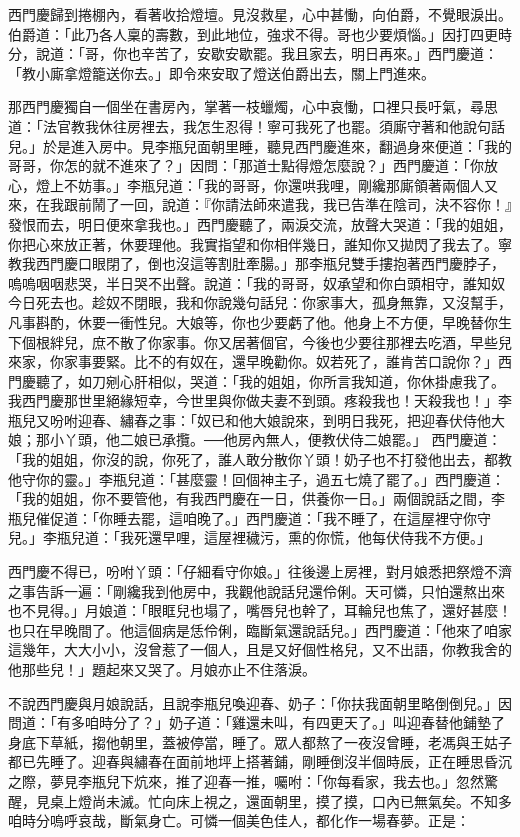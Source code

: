 西門慶歸到捲棚內，看著收拾燈壇。見沒救星，心中甚慟，向伯爵，不覺眼淚出。伯爵道：「此乃各人稟的壽數，到此地位，強求不得。哥也少要煩惱。」因打四更時分，說道：「哥，你也辛苦了，安歇安歇罷。我且家去，明日再來。」西門慶道：「教小廝拿燈籠送你去。」即令來安取了燈送伯爵出去，關上門進來。

那西門慶獨自一個坐在書房內，掌著一枝蠟燭，心中哀慟，口裡只長吁氣，尋思道：「法官教我休往房裡去，我怎生忍得！寧可我死了也罷。須廝守著和他說句話兒。」於是進入房中。見李瓶兒面朝里睡，聽見西門慶進來，翻過身來便道：「我的哥哥，你怎的就不進來了？」因問：「那道士點得燈怎麼說？」西門慶道：「你放心，燈上不妨事。」李瓶兒道：「我的哥哥，你還哄我哩，剛纔那廝領著兩個人又來，在我跟前鬧了一回，說道：『你請法師來遣我，我已告準在陰司，決不容你！』發恨而去，明日便來拿我也。」西門慶聽了，兩淚交流，放聲大哭道：「我的姐姐，你把心來放正著，休要理他。我實指望和你相伴幾日，誰知你又拋閃了我去了。寧教我西門慶口眼閉了，倒也沒這等割肚牽腸。」那李瓶兒雙手摟抱著西門慶脖子，嗚嗚咽咽悲哭，半日哭不出聲。說道：「我的哥哥，奴承望和你白頭相守，誰知奴今日死去也。趁奴不閉眼，我和你說幾句話兒：你家事大，孤身無靠，又沒幫手，凡事斟酌，休要一衝性兒。大娘等，你也少要虧了他。他身上不方便，早晚替你生下個根絆兒，庶不散了你家事。你又居著個官，今後也少要往那裡去吃酒，早些兒來家，你家事要緊。比不的有奴在，還早晚勸你。奴若死了，誰肯苦口說你？」西門慶聽了，如刀剜心肝相似，哭道：「我的姐姐，你所言我知道，你休掛慮我了。我西門慶那世里絕緣短幸，今世里與你做夫妻不到頭。疼殺我也！天殺我也！」李瓶兒又吩咐迎春、繡春之事：「奴已和他大娘說來，到明日我死，把迎春伏侍他大娘；那小丫頭，他二娘已承攬。──他房內無人，便教伏侍二娘罷。」 西門慶道：「我的姐姐，你沒的說，你死了，誰人敢分散你丫頭！奶子也不打發他出去，都教他守你的靈。」李瓶兒道：「甚麼靈！回個神主子，過五七燒了罷了。」西門慶道：「我的姐姐，你不要管他，有我西門慶在一日，供養你一日。」兩個說話之間，李瓶兒催促道：「你睡去罷，這咱晚了。」西門慶道：「我不睡了，在這屋裡守你守兒。」李瓶兒道：「我死還早哩，這屋裡穢污，熏的你慌，他每伏侍我不方便。」

西門慶不得已，吩咐丫頭：「仔細看守你娘。」往後邊上房裡，對月娘悉把祭燈不濟之事告訴一遍：「剛纔我到他房中，我觀他說話兒還伶俐。天可憐，只怕還熬出來也不見得。」月娘道：「眼眶兒也塌了，嘴唇兒也幹了，耳輪兒也焦了，還好甚麼！也只在早晚間了。他這個病是恁伶俐，臨斷氣還說話兒。」西門慶道：「他來了咱家這幾年，大大小小，沒曾惹了一個人，且是又好個性格兒，又不出語，你教我舍的他那些兒！」題起來又哭了。月娘亦止不住落淚。

不說西門慶與月娘說話，且說李瓶兒喚迎春、奶子：「你扶我面朝里略倒倒兒。」因問道：「有多咱時分了？」奶子道：「雞還未叫，有四更天了。」叫迎春替他鋪墊了身底下草紙，搊他朝里，蓋被停當，睡了。眾人都熬了一夜沒曾睡，老馮與王姑子都已先睡了。迎春與繡春在面前地坪上搭著鋪，剛睡倒沒半個時辰，正在睡思昏沉之際，夢見李瓶兒下炕來，推了迎春一推，囑咐：「你每看家，我去也。」忽然驚醒，見桌上燈尚未滅。忙向床上視之，還面朝里，摸了摸，口內已無氣矣。不知多咱時分嗚呼哀哉，斷氣身亡。可憐一個美色佳人，都化作一場春夢。正是：

